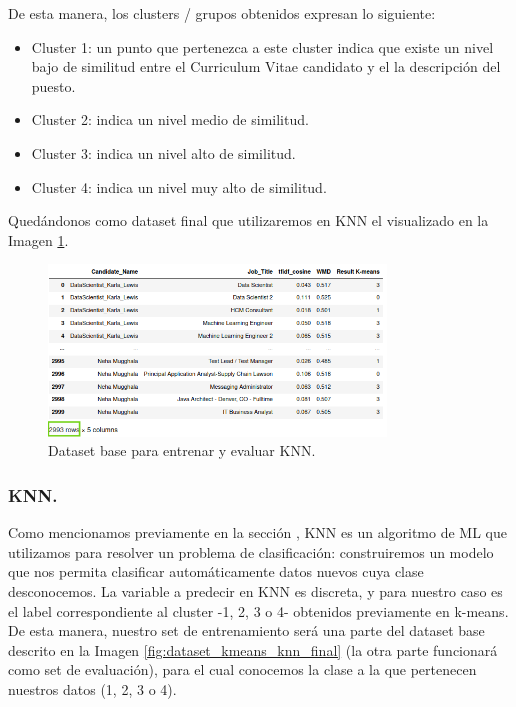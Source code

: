 \documentclass[12pt,a4paper]{article}
\begin{document}
\begin{sloppypar}
De esta manera, los clusters / grupos obtenidos expresan lo siguiente:
\begin{itemize}
\item Cluster 1: un punto que pertenezca a este cluster indica que existe un nivel bajo de similitud entre el Curriculum Vitae candidato y el la descripción del puesto.
\item Cluster 2: indica un nivel medio de similitud.
\item Cluster 3: indica un nivel alto de similitud.
\item Cluster 4: indica un nivel muy alto de similitud. 
\end{itemize}

Quedándonos como dataset final que utilizaremos en KNN el visualizado en la Imagen \ref{fig:to_knn}.

\begin{figure}[H]   
\centering
\includegraphics[width=0.8\textwidth]{images/implementacion_5/to_knn.png}
\captionsetup{justification=centering,margin=2cm}
\caption{Dataset base para entrenar y evaluar KNN.\\}
\label{fig:to_knn}
\end{figure}

\subsubsection{KNN.}\label{imp_knn}

Como mencionamos previamente en la sección \textit{}, KNN es un algoritmo de ML que utilizamos para resolver un problema de clasificación: construiremos un modelo que nos permita clasificar automáticamente datos nuevos cuya clase desconocemos. La variable a predecir en KNN es discreta, y para nuestro caso es el label correspondiente al cluster -1, 2, 3 o 4- obtenidos previamente en k-means. De esta manera, nuestro set de entrenamiento será una parte del dataset base descrito en la Imagen \ref{fig:dataset_kmeans_knn_final} (la otra parte funcionará como set de evaluación), para el cual conocemos la clase a la que pertenecen nuestros datos (1, 2, 3 o 4).


\end{sloppypar}
\end{document}
